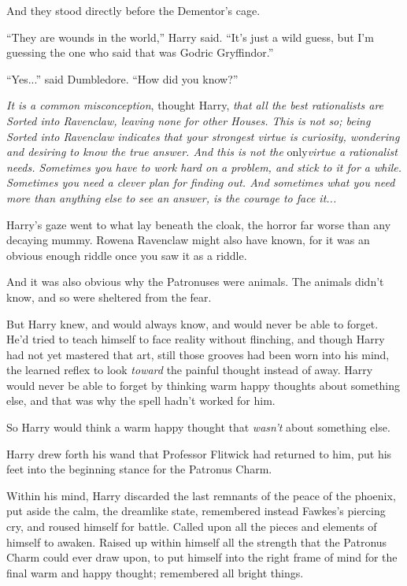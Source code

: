 And they stood directly before the Dementor's cage.

``They are wounds in the world,'' Harry said. ``It's just a wild guess,
but I'm guessing the one who said that was Godric Gryffindor.''

``Yes...'' said Dumbledore. ``How did you know?''

\emph{It is a common misconception}, thought Harry, \emph{that all the
best rationalists are Sorted into Ravenclaw, leaving none for other
Houses. This is not so; being Sorted into Ravenclaw indicates that your
strongest virtue is curiosity, wondering and desiring to know the true
answer. And this is not the} only\emph{virtue a rationalist needs.
Sometimes you have to work hard on a problem, and stick to it for a
while. Sometimes you need a clever plan for finding out. And sometimes
what you need more than anything else to see an answer, is the courage
to face it...}

Harry's gaze went to what lay beneath the cloak, the horror far worse
than any decaying mummy. Rowena Ravenclaw might also have known, for it
was an obvious enough riddle once you saw it as a riddle.

And it was also obvious why the Patronuses were animals. The animals
didn't know, and so were sheltered from the fear.

But Harry knew, and would always know, and would never be able to
forget. He'd tried to teach himself to face reality without flinching,
and though Harry had not yet mastered that art, still those grooves had
been worn into his mind, the learned reflex to look \emph{toward} the
painful thought instead of away. Harry would never be able to forget by
thinking warm happy thoughts about something else, and that was why the
spell hadn't worked for him.

So Harry would think a warm happy thought that \emph{wasn't} about
something else.

Harry drew forth his wand that Professor Flitwick had returned to him,
put his feet into the beginning stance for the Patronus Charm.

Within his mind, Harry discarded the last remnants of the peace of the
phoenix, put aside the calm, the dreamlike state, remembered instead
Fawkes's piercing cry, and roused himself for battle. Called upon all
the pieces and elements of himself to awaken. Raised up within himself
all the strength that the Patronus Charm could ever draw upon, to put
himself into the right frame of mind for the final warm and happy
thought; remembered all bright things.

